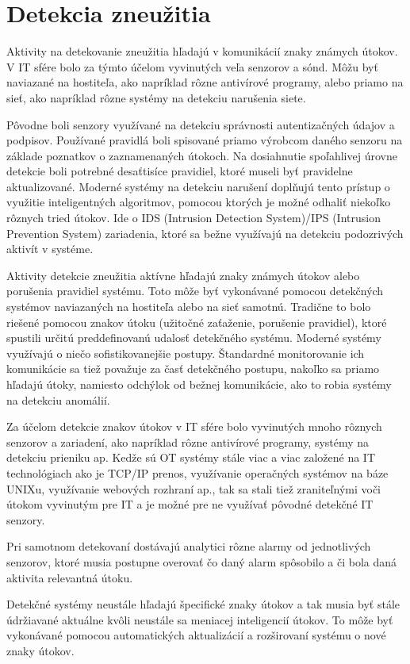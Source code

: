 \section{Detekcia zneužitia}
\tab Aktivity na detekovanie zneužitia hľadajú v komunikácií znaky známych útokov. V IT sfére bolo za týmto účelom vyvinutých veľa senzorov a sónd. Môžu byť naviazané na hostiteľa, ako napríklad rôzne antivírové programy, alebo priamo na sieť, ako napríklad rôzne systémy na detekciu narušenia siete. \par
Pôvodne boli senzory využívané na detekciu správnosti autentizačných údajov a podpisov. Používané pravidlá boli spisované priamo výrobcom daného senzoru na základe poznatkov o zaznamenaných útokoch. Na dosiahnutie spoľahlivej úrovne detekcie boli potrebné desaťtisíce pravidiel, ktoré museli byť pravidelne aktualizované. Moderné systémy na detekciu narušení doplňujú tento prístup o využitie inteligentných algoritmov, pomocou ktorých je možné odhaliť niekoľko rôznych tried útokov. Ide o IDS (Intrusion Detection System)/IPS (Intrusion Prevention System) zariadenia, ktoré sa bežne využívajú na detekciu podozrivých aktivít v systéme. \par
Aktivity detekcie zneužitia aktívne hľadajú znaky známych útokov alebo porušenia pravidiel systému. Toto môže byť vykonávané pomocou detekčných systémov naviazaných na hostiteľa alebo na sieť samotnú. Tradične to bolo riešené pomocou znakov útoku (užitočné zaťaženie, porušenie pravidiel), ktoré spustili určitú preddefinovanú udalosť detekčného systému. Moderné systémy využívajú o niečo sofistikovanejšie postupy. Štandardné monitorovanie ich komunikácie sa tiež považuje za časť detekčného postupu, nakoľko sa priamo hľadajú útoky, namiesto odchýlok od bežnej komunikácie, ako to robia systémy na detekciu anomálií. \par
Za účelom detekcie znakov útokov v IT sfére bolo vyvinutých mnoho rôznych senzorov a zariadení, ako napríklad rôzne antivírové programy, systémy na detekciu prieniku ap. Kedže sú OT systémy stále viac a viac založené na IT technológiach ako je TCP/IP prenos, využívanie operačných systémov na báze UNIXu, využívanie webových rozhraní ap., tak sa stali tiež zraniteľnými voči útokom vyvinutým pre IT a je možné pre ne využívať pôvodné detekčné IT senzory. \par
Pri samotnom detekovaní dostávajú analytici rôzne alarmy od jednotlivých senzorov, ktoré musia postupne overovať čo daný alarm spôsobilo a či bola daná aktivita relevantná útoku. \par
Detekčné systémy neustále hľadajú špecifické znaky útokov a tak musia byť stále údržiavané aktuálne kvôli neustále sa meniacej inteligencií útokov. To môže byť vykonávané pomocou automatických aktualizácií a rozširovaní systému o nové znaky útokov\cite{Security}.

